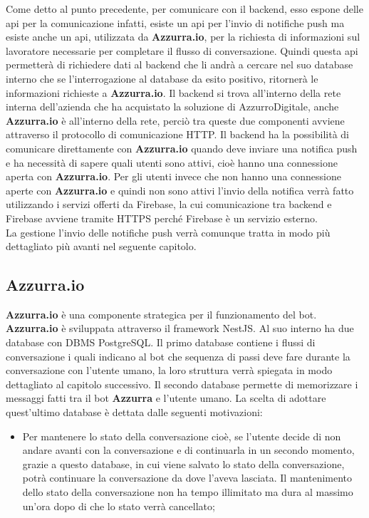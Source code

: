 \begin{trivlist}
	Come detto al punto precedente, per comunicare con il backend, esso espone delle \gls{api} per la comunicazione infatti, esiste un \gls{api} per l'invio di notifiche push ma esiste anche un \gls{api}, utilizzata da \textbf{Azzurra.io}, per la richiesta di informazioni sul lavoratore necessarie per completare il flusso di conversazione. Quindi questa \gls{api} permetterà di richiedere dati al backend che li andrà a cercare nel suo database interno che se l'interrogazione al database da esito positivo, ritornerà le informazioni richieste a \textbf{Azzurra.io}. Il backend si trova all'interno della rete interna dell'azienda che ha acquistato la soluzione di AzzurroDigitale, anche \textbf{Azzurra.io} è all'interno della rete, perciò tra queste due componenti avviene attraverso il protocollo di comunicazione HTTP. Il backend ha la possibilità di comunicare direttamente con \textbf{Azzurra.io} quando deve inviare una notifica push e ha necessità di sapere quali utenti sono attivi, cioè hanno una connessione aperta con \textbf{Azzurra.io}. Per gli utenti invece che non hanno una connessione aperte con \textbf{Azzurra.io} e quindi non sono attivi l'invio della notifica verrà fatto utilizzando i servizi offerti da Firebase, la cui comunicazione tra backend e Firebase avviene tramite HTTPS perché Firebase è un servizio esterno.\\
	La gestione l'invio delle notifiche push verrà comunque tratta in modo più dettagliato più avanti nel seguente capitolo.
	\item \subsection{Azzurra.io}
	\textbf{Azzurra.io} è una componente strategica per il funzionamento del bot. \textbf{Azzurra.io} è sviluppata attraverso il framework NestJS. Al suo interno ha due database con DBMS PostgreSQL. Il primo database contiene i flussi di conversazione i quali indicano al bot che sequenza di passi deve fare durante la conversazione con l'utente umano, la loro struttura verrà spiegata in modo dettagliato al capitolo successivo. Il secondo database permette di memorizzare i messaggi fatti tra il bot \textbf{Azzurra} e l'utente umano. La scelta di adottare quest'ultimo database è dettata dalle seguenti motivazioni:
	\begin{itemize}
		\item Per mantenere lo stato della conversazione cioè, se l'utente decide di non andare avanti con la conversazione e di continuarla in un secondo momento, grazie a questo database, in cui viene salvato lo stato della conversazione, potrà continuare la conversazione da dove l'aveva lasciata. Il mantenimento dello stato della conversazione non ha tempo illimitato ma dura al massimo un'ora dopo di che lo stato verrà cancellato;

\end{itemize}
\end{trivlist}
